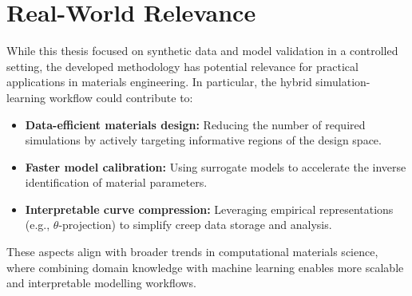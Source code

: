 \documentclass[class=scrbook, crop=false]{standalone}
\begin{document}
\section{Real-World Relevance}
\label{Section::Discussion_RealWorldRelevance}

While this thesis focused on synthetic data and model validation in a controlled setting, the developed methodology has potential relevance for practical applications in materials engineering. In particular, the hybrid simulation-learning workflow could contribute to:

\begin{itemize}
	\item \textbf{Data-efficient materials design:} Reducing the number of required simulations by actively targeting informative regions of the design space.
	\item \textbf{Faster model calibration:} Using surrogate models to accelerate the inverse identification of material parameters.
	\item \textbf{Interpretable curve compression:} Leveraging empirical representations (e.g., $\theta$-projection) to simplify creep data storage and analysis.
\end{itemize}

These aspects align with broader trends in computational materials science, where combining domain knowledge with machine learning enables more scalable and interpretable modelling workflows.

\clearpage

\ifstandalone
	\printglossary
	\printbibliography[heading=bibintoc]
\fi
\end{document}

